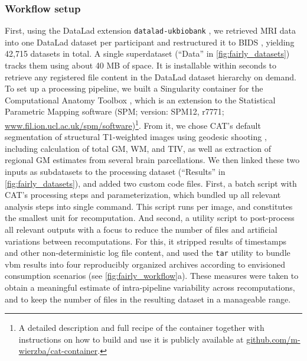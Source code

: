 \subsubsection{Workflow setup}

First, using the DataLad extension \texttt{datalad-ukbiobank} \citep{hanke_michael_2022_7296550}, we retrieved MRI data into one DataLad dataset per participant and restructured it to BIDS \citep{gorgolewski2016brain}, yielding 42,715 datasets in total.
A single superdataset (``Data'' in \cref{fig:fairly_datasets}) tracks them using about 40 MB of space.
It is installable within seconds to retrieve any registered file content in the DataLad dataset hierarchy on demand.\\
To set up a processing pipeline, we built a Singularity container for the Computational Anatomy Toolbox \citep[CAT; version: CAT12.7-RC2, r1720]{gaser}, which is an extension to the Statistical Parametric Mapping software (SPM; version: SPM12, r7771; \url{www.fil.ion.ucl.ac.uk/spm/software})\footnote{A detailed description and full recipe of the container together with instructions on how to build and use it is publicly available at \url{github.com/m-wierzba/cat-container}.}.
From it, we chose \gls{CAT}'s default segmentation of structural T1-weighted images using geodesic shooting \citep{ashburner2011diffeomorphic}, including calculation of total \gls{GM}, \gls{WM}, and \gls{TIV}, as well as extraction of regional \gls{GM} estimates from several brain parcellations.
We then linked these two inputs as subdatasets to the processing dataset (``Results'' in \cref{fig:fairly_datasets}), and added two custom code files.
First, a batch script with \gls{CAT}'s processing steps and parameterization, which bundled up all relevant analysis steps into single command.
This script runs per image, and constitutes the smallest unit for recomputation.
And second, a utility script to post-process all relevant outputs with a focus to reduce the number of files and artificial variations between recomputations.
For this, it stripped results of timestamps and other non-deterministic log file content, and used the \texttt{tar} utility to bundle \gls{vbm} results into four reproducibly organized archives according to envisioned consumption scenarios (see \cref{fig:fairly_workflow}a).
These measures were taken to obtain a meaningful estimate of intra-pipeline variability across recomputations, and to keep the number of files in the resulting dataset in a manageable range.\\
